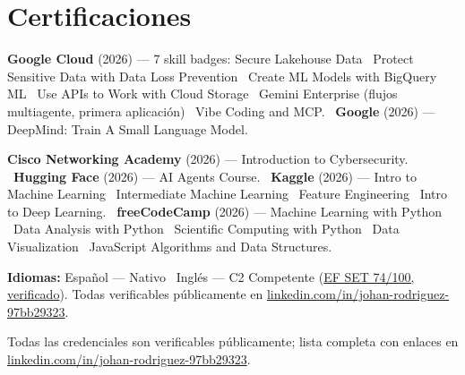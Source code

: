\section{Certificaciones}

\ifonepage
{\footnotesize\noindent
\textbf{Google Cloud} (2026) --- 7 skill badges: Secure Lakehouse Data \textbullet\ Protect Sensitive
Data with Data Loss Prevention \textbullet\ Create ML Models with BigQuery ML \textbullet\ Use APIs to
Work with Cloud Storage \textbullet\ Gemini Enterprise (flujos multiagente, primera aplicación)
\textbullet\ Vibe Coding and MCP. \ \textbf{Google} (2026) --- DeepMind: Train A Small Language Model.\par
\vspace{0.2ex}\noindent
\textbf{Cisco Networking Academy} (2026) --- Introduction to Cybersecurity. \
\textbf{Hugging Face} (2026) --- AI Agents Course. \
\textbf{Kaggle} (2026) --- Intro to Machine Learning \textbullet\ Intermediate Machine Learning
\textbullet\ Feature Engineering \textbullet\ Intro to Deep Learning. \
\textbf{freeCodeCamp} (2026) --- Machine Learning with Python \textbullet\ Data Analysis with Python
\textbullet\ Scientific Computing with Python \textbullet\ Data Visualization \textbullet\ JavaScript
Algorithms and Data Structures.\par
\vspace{0.2ex}\noindent
\textbf{Idiomas:} Español --- Nativo \textbullet\ Inglés --- C2 Competente
(\href{https://cert.efset.org/es/qpqdd3}{EF SET 74/100, verificado}).
{\color{subtle}Todas verificables públicamente en
\href{https://www.linkedin.com/in/johan-rodriguez-97bb29323/details/certifications/}{linkedin.com/in/johan-rodriguez-97bb29323}.}\par}
\else
{\footnotesize\color{subtle}Todas las credenciales son verificables públicamente; lista completa con
enlaces en
\href{https://www.linkedin.com/in/johan-rodriguez-97bb29323/details/certifications/}{linkedin.com/in/johan-rodriguez-97bb29323}.}
\vspace{0.4ex}
